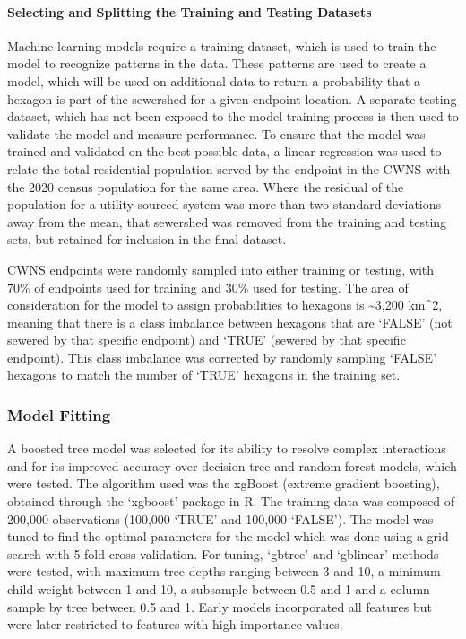 \documentclass[
  letterpaper,
  DIV=11,
  numbers=noendperiod]{scrartcl}
\let\oldparagraph\paragraph
\renewcommand{\paragraph}[1]{\oldparagraph{#1}\mbox{}}
\begin{document}
\paragraph{Selecting and Splitting the Training and Testing
Datasets}\label{selecting-and-splitting-the-training-and-testing-datasets}

Machine learning models require a training dataset, which is used to
train the model to recognize patterns in the data. These patterns are
used to create a model, which will be used on additional data to return
a probability that a hexagon is part of the sewershed for a given
endpoint location. A separate testing dataset, which has not been
exposed to the model training process is then used to validate the model
and measure performance. To ensure that the model was trained and
validated on the best possible data, a linear regression was used to
relate the total residential population served by the endpoint in the
CWNS with the 2020 census population for the same area. Where the
residual of the population for a utility sourced system was more than
two standard deviations away from the mean, that sewershed was removed
from the training and testing sets, but retained for inclusion in the
final dataset.

CWNS endpoints were randomly sampled into either training or testing,
with 70\% of endpoints used for training and 30\% used for testing. The
area of consideration for the model to assign probabilities to hexagons
is \textasciitilde3,200 km\^{}2, meaning that there is a class imbalance
between hexagons that are `FALSE' (not sewered by that specific
endpoint) and `TRUE' (sewered by that specific endpoint). This class
imbalance was corrected by randomly sampling `FALSE' hexagons to match
the number of `TRUE' hexagons in the training set.

\subsubsection{Model Fitting}\label{model-fitting}

A boosted tree model was selected for its ability to resolve complex
interactions and for its improved accuracy over decision tree and random
forest models, which were tested. The algorithm used was the xgBoost
(extreme gradient boosting), obtained through the `xgboost' package in
R. The training data was composed of 200,000 observations (100,000
`TRUE' and 100,000 `FALSE'). The model was tuned to find the optimal
parameters for the model which was done using a grid search with 5-fold
cross validation. For tuning, `gbtree' and `gblinear' methods were
tested, with maximum tree depths ranging between 3 and 10, a minimum
child weight between 1 and 10, a subsample between 0.5 and 1 and a
column sample by tree between 0.5 and 1. Early models incorporated all
features but were later restricted to features with high importance
values.
\end{document}
